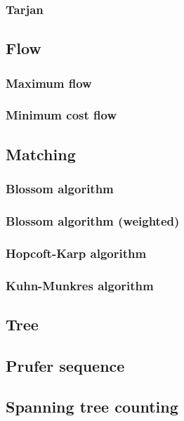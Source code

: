 \documentclass[titlepage,a4paper,10pt]{article}
\begin{document}
\begin{multicols}{2}
\begin{spacing}{0.8}
{				\subsubsection{Tarjan}
					
			\subsection{Flow}
				\subsubsection{Maximum flow}
					
				\subsubsection{Minimum cost flow}
					
			\subsection{Matching}
				
				\subsubsection{Blossom algorithm}
					
				\subsubsection{Blossom algorithm (weighted)}
					
				\subsubsection{Hopcoft-Karp algorithm}
					
				\subsubsection{Kuhn-Munkres algorithm}
					
			\subsection{Tree}
				\subsection{Prufer sequence}
					
				\subsection{Spanning tree counting}
					
}
\end{spacing}
\end{multicols}
\end{document}
